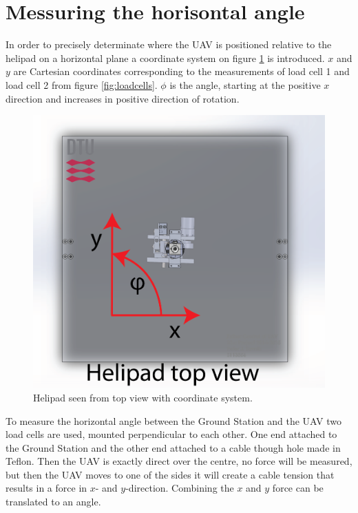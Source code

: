 \section{Messuring the horisontal angle}
\label{sec:horizontalAnglePrototype}
In order to precisely determinate where the UAV is positioned relative to the helipad on a horizontal plane a coordinate system on figure \ref{fig:top-coordinates} is introduced. $x$ and $y$ are Cartesian coordinates corresponding to the measurements of load cell 1 and load cell 2 from figure \ref{fig:loadcells}. $\phi$ is the angle, starting at the positive $x$ direction and increases in positive direction of rotation.

\begin{figure}[hbtp]
\centering
\includegraphics[scale=0.6]{graphics/cad/top-coordinates.png}
\caption{Helipad seen from top view with coordinate system.}
\label{fig:top-coordinates}
\end{figure}

\noindent
To measure the horizontal angle between the Ground Station and the UAV two load cells are used, mounted perpendicular to each other. One end attached to the Ground Station and the other end attached to a cable though hole made in Teflon. Then the UAV is exactly direct over the centre, no force will be measured, but then the UAV moves to one of the sides it will create a cable tension that results in a force in $x$- and $y$-direction. Combining the $x$ and $y$ force can be translated to an angle. 

